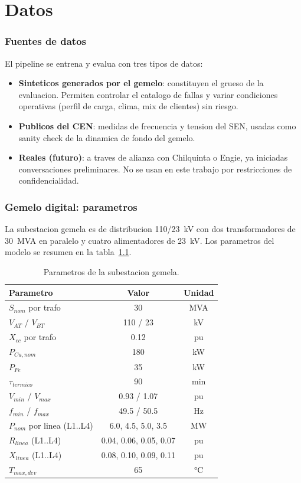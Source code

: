 \chapter{Datos}

\subsection{Fuentes de datos}

El pipeline se entrena y evalua con tres tipos de datos:

\begin{itemize}[leftmargin=*,itemsep=2pt]
  \item \textbf{Sinteticos generados por el gemelo}: constituyen el grueso
        de la evaluacion. Permiten controlar el catalogo de fallas y
        variar condiciones operativas (perfil de carga, clima, mix de
        clientes) sin riesgo.
  \item \textbf{Publicos del CEN}: medidas de frecuencia y tension del
        SEN, usadas como sanity check de la dinamica de fondo del gemelo.
  \item \textbf{Reales (futuro)}: a traves de alianza con Chilquinta o
        Engie, ya iniciadas conversaciones preliminares. No se usan en
        este trabajo por restricciones de confidencialidad.
\end{itemize}

\subsection{Gemelo digital: parametros}

La subestacion gemela es de distribucion 110/23~kV con dos
transformadores de 30~MVA en paralelo y cuatro alimentadores de
23~kV. Los parametros del modelo se resumen en la
tabla~\ref{tab:parametros}.

\begin{table}[ht]
\centering
\small
\caption{Parametros de la subestacion gemela.}
\label{tab:parametros}
\begin{tabular}{lcc}
\toprule
\textbf{Parametro} & \textbf{Valor} & \textbf{Unidad} \\
\midrule
$S_{nom}$ por trafo & 30 & MVA \\
$V_{AT}$ / $V_{BT}$ & 110 / 23 & kV \\
$X_{cc}$ por trafo & 0.12 & pu \\
$P_{Cu,nom}$ & 180 & kW \\
$P_{Fe}$ & 35 & kW \\
$\tau_{termico}$ & 90 & min \\
$V_{min}$ / $V_{max}$ & 0.93 / 1.07 & pu \\
$f_{min}$ / $f_{max}$ & 49.5 / 50.5 & Hz \\
$P_{nom}$ por linea (L1..L4) & 6.0, 4.5, 5.0, 3.5 & MW \\
$R_{linea}$ (L1..L4) & 0.04, 0.06, 0.05, 0.07 & pu \\
$X_{linea}$ (L1..L4) & 0.08, 0.10, 0.09, 0.11 & pu \\
$T_{max,dev}$ & 65 & \si{\degree}C} \\
\bottomrule
\end{tabular}
\end{table}

